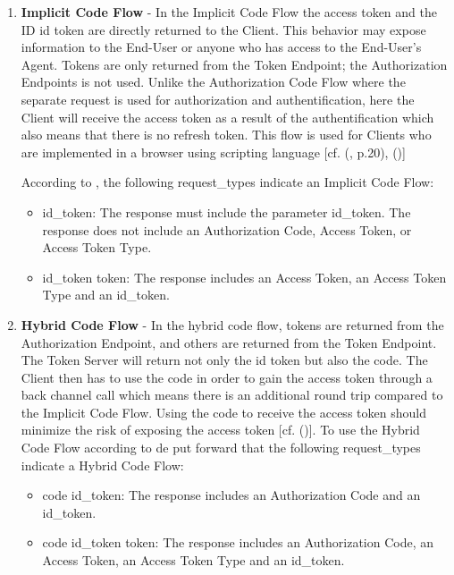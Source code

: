 {{{\begin{enumerate}
		To use the Authorization Code Flow according to \cite{Sakimura:2014:OpenIDConnect} the the following request\_type indicates a Authorization Code Flow:
		\begin{itemize}
			\item	code: The response includes an Authorization Code. 
		\end{itemize}
		
		\item \textbf{Implicit Code Flow} - In the Implicit Code Flow the access token and the ID id token are directly returned to the Client. This behavior may expose information to the End-User or anyone who has access to the End-User’s Agent. Tokens are only returned from the Token Endpoint; the Authorization Endpoints is not used. Unlike the Authorization Code Flow where the separate request is used for authorization and authentification, here the Client will receive the access token as a result of the authentification which also means that there is no refresh token.  This flow is used for Clients who are implemented in a browser using scripting language [cf. (\cite{Sakimura:2014:OpenIDConnect}, p.20), (\cite{Hardt:2012:OAuth2})]
		
		According to \cite{Sakimura:2014:OpenIDConnect}, the following request\_types indicate an Implicit Code Flow:
		\begin{itemize}
			\item	id\_token: The response must include the parameter id\_token. The response does not include an Authorization Code, Access Token, or Access Token Type. 
			\item  id\_token token: The response includes an Access Token, an Access Token Type and an id\_token.
		\end{itemize}
		
		\item \textbf{Hybrid Code Flow} - In the hybrid code flow, tokens are returned from the Authorization Endpoint, and others are returned from the Token Endpoint. The Token Server will return not only the id token but also the code. The Client then has to use the code in order to gain the access token through a back channel call which means there is an additional round trip compared to the Implicit Code Flow. Using the code to receive the access token should minimize the risk of exposing the access token [cf. (\cite{Sakimura:2014:OpenIDConnect})].
		To use the Hybrid Code Flow according to de \cite{Sakimura:2014:OpenIDConnect} put forward that the following request\_types indicate a Hybrid Code Flow:
		\begin{itemize}
			\item	code id\_token: The response includes an Authorization Code and an id\_token.
			\item  code id\_token token: The response includes an Authorization Code, an Access Token, an Access Token Type and an id\_token. 
		\end{itemize} 
		

\end{enumerate}}}}
